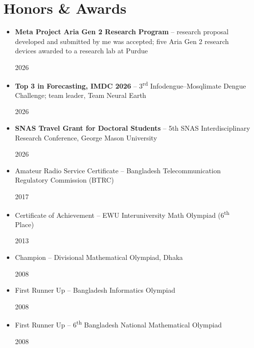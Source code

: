 \documentclass[letterpaper,10pt]{article}
\newcommand{\resumeDated}[2]{\item\small\parbox[t]{0.8\textwidth}{\raggedright #1}\hfill\mbox{#2}\vspace{-1pt}}
\newcommand{\bulletList}{\begin{itemize}[leftmargin=0.15in, itemsep=1pt]}
\newcommand{\bulletListEnd}{\end{itemize}}
\begin{document}
\section{Honors \& Awards}
\bulletList
  \resumeDated{\textbf{Meta Project Aria Gen 2 Research Program} -- research proposal developed and submitted by me was accepted; five Aria Gen 2 research devices awarded to a research lab at Purdue}{2026}
  \resumeDated{\textbf{Top 3 in Forecasting, IMDC 2026} -- 3\textsuperscript{rd} Infodengue--Mosqlimate Dengue Challenge; team leader, Team Neural Earth}{2026}
  \resumeDated{\textbf{SNAS Travel Grant for Doctoral Students} -- 5th SNAS Interdisciplinary Research Conference, George Mason University}{2026}
  \resumeDated{Amateur Radio Service Certificate -- Bangladesh Telecommunication Regulatory Commission (BTRC)}{2017}
  \resumeDated{Certificate of Achievement -- EWU Interuniversity Math Olympiad (6\textsuperscript{th} Place)}{2013}
  \resumeDated{Champion -- Divisional Mathematical Olympiad, Dhaka}{2008}
  \resumeDated{First Runner Up -- Bangladesh Informatics Olympiad}{2008}
  \resumeDated{First Runner Up -- 6\textsuperscript{th} Bangladesh National Mathematical Olympiad}{2008}
\bulletListEnd

\end{document}
